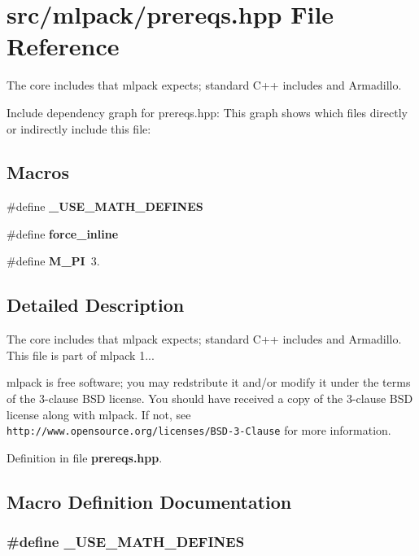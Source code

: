 \section{src/mlpack/prereqs.hpp File Reference}
\label{prereqs_8hpp}


The core includes that mlpack expects; standard C++ includes and Armadillo.  


Include dependency graph for prereqs.\-hpp\-:
This graph shows which files directly or indirectly include this file\-:
\subsection*{Macros}
\begin{DoxyCompactItemize}
\item 
\#define {\bf \-\_\-\-U\-S\-E\-\_\-\-M\-A\-T\-H\-\_\-\-D\-E\-F\-I\-N\-E\-S}
\item 
\#define {\bf force\-\_\-inline}
\item 
\#define {\bf M\-\_\-\-P\-I}~3.
\end{DoxyCompactItemize}


\subsection{Detailed Description}
The core includes that mlpack expects; standard C++ includes and Armadillo. This file is part of mlpack 1...

mlpack is free software; you may redstribute it and/or modify it under the terms of the 3-\/clause B\-S\-D license. You should have received a copy of the 3-\/clause B\-S\-D license along with mlpack. If not, see {\tt http\-://www.\-opensource.\-org/licenses/\-B\-S\-D-\/3-\/\-Clause} for more information. 

Definition in file {\bf prereqs.\-hpp}.



\subsection{Macro Definition Documentation}
\subsubsection[{\-\_\-\-U\-S\-E\-\_\-\-M\-A\-T\-H\-\_\-\-D\-E\-F\-I\-N\-E\-S}]{\setlength{\rightskip}{0pt plus 5cm}\#define \-\_\-\-U\-S\-E\-\_\-\-M\-A\-T\-H\-\_\-\-D\-E\-F\-I\-N\-E\-S}\label{prereqs_8hpp_a525335710b53cb064ca56b936120431e}


